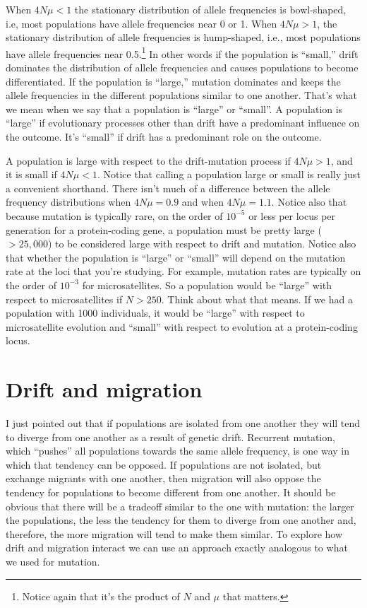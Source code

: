 \documentclass[12pt]{article}
\begin{document}
When $4N\mu < 1$ the stationary distribution of allele frequencies is
bowl-shaped, i.e, most populations have allele frequencies near 0 or
1. When $4N\mu > 1$, the stationary distribution of allele frequencies
is hump-shaped, i.e., most populations have allele frequencies near
0.5.\footnote{Notice again that it's the product of $N$ and $\mu$ that
  matters.} In other words if the population is ``small,'' drift
dominates the distribution of allele frequencies and causes
populations to become differentiated. If the population is ``large,''
mutation dominates and keeps the allele frequencies in the different
populations similar to one another. That's what we mean when we say
that a population is ``large'' or ``small''. A population is ``large''
if evolutionary processes other than drift have a predominant
influence on the outcome. It's ``small'' if drift has a predominant
role on the outcome.

A population is large with respect to the drift-mutation process if
$4N\mu > 1$, and it is small if $4N\mu < 1$. Notice that calling a
population large or small is really just a convenient shorthand. There
isn't much of a difference between the allele frequency distributions
when $4N\mu = 0.9$ and when $4N\mu = 1.1$. Notice also that because
mutation is typically rare, on the order of $10^{-5}$ or less per
locus per generation for a protein-coding gene, a population must be
pretty large ($> 25,000$) to be considered large with respect to
drift and mutation. Notice also that whether the population is ``large''
or ``small'' will depend on the mutation rate at the loci that you're
studying. For example, mutation rates are typically on the order of 
$10^{-3}$ for microsatellites. So a population would be ``large'' with
respect to microsatellites if $N > 250$. Think about what that
means. If we had a population with 1000 individuals, it would be
``large'' with respect to microsatellite evolution and ``small'' with
respect to evolution at a protein-coding locus.

\section*{Drift and migration}

I just pointed out that if populations are isolated from one another
they will tend to diverge from one another as a result of genetic
drift. Recurrent mutation, which ``pushes'' all populations towards
the same allele frequency, is one way in which that tendency can be
opposed. If populations are not isolated, but exchange migrants with
one another, then migration will also oppose the tendency for
populations to become different from one another. It should be obvious
that there will be a tradeoff similar to the one with mutation: the
larger the populations, the less the tendency for them to diverge from
one another and, therefore, the more migration will tend to make them
similar. To explore how drift and migration interact we can use an
approach exactly analogous to what we used for mutation.
\end{document}
